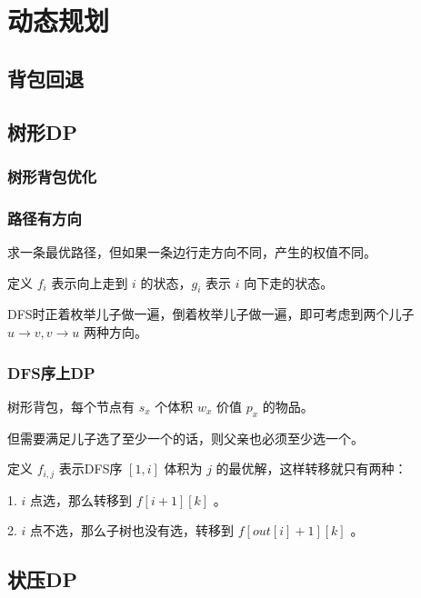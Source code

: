 \section{动态规划}

\subsection{背包回退}



\subsection{树形DP}

\subsubsection{树形背包优化}



\subsubsection{路径有方向}

求一条最优路径，但如果一条边行走方向不同，产生的权值不同。

定义 $f_i$ 表示向上走到 $i$ 的状态，$g_i$ 表示 $i$ 向下走的状态。

DFS时正着枚举儿子做一遍，倒着枚举儿子做一遍，即可考虑到两个儿子 $u\to v,v\to u$ 两种方向。

\subsubsection{DFS序上DP}

树形背包，每个节点有 $s_x$ 个体积 $w_x$ 价值 $p_x$ 的物品。

但需要满足儿子选了至少一个的话，则父亲也必须至少选一个。

定义 $f_{i,j}$ 表示DFS序 $[1,i]$ 体积为 $j$ 的最优解，这样转移就只有两种：

1. $i$ 点选，那么转移到 $f[i+1][k]$ 。

2. $i$ 点不选，那么子树也没有选，转移到 $f[out[i]+1][k]$ 。



\subsection{状压DP}

